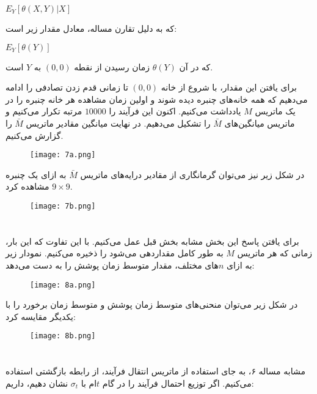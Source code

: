 \documentclass{scribe-cgenomics}
\begin{document}
\begin{center}
$
E_Y[\theta (X, Y) | X]
$
\end{center}

که به دلیل تقارن مساله، معادل مقدار زیر است:

\begin{center}
$
E_Y[\theta (Y)]
$
\end{center}

که در آن
$\theta(Y)$
زمان رسیدن از نقطه
$(0,0)$
به
$Y$
است.

برای یافتن این مقدار، با شروع از خانه
$(0,0)$
تا زمانی قدم زدن تصادفی را ادامه می‌دهیم که همه خانه‌های چنبره دیده شوند و اولین زمان مشاهده هر خانه چنبره را در یک ماتریس
$M$
یادداشت می‌کنیم. اکنون این فرآیند را
$10000$
مرتبه تکرار می‌کنیم و ماتریس میانگین‌های
$\bar{M}$
را تشکیل می‌دهیم. در نهایت میانگین مقادیر ماتریس
$\bar{M}$
را گزارش می‌کنیم.


\begin{figure}[h]\label{7}
\texttt{[image: 7a.png]}
\centering
\end{figure}

در شکل زیر نیز می‌توان گرمانگاری از مقادیر درایه‌های ماتریس
$\bar{M}$
به ازای یک چنبره
$9 \times 9$
مشاهده کرد.

\begin{figure}[h]\label{7hist}
\texttt{[image: 7b.png]}
\centering
\end{figure}

\newpage
\section{}

برای یافتن پاسخ این بخش مشابه بخش قبل عمل می‌کنیم. با این تفاوت که این بار، زمانی که هر ماتریس
$M$
به طور کامل مقداردهی می‌شود را ذخیره می‌کنیم. نمودار زیر به ازای
$n$های
مختلف، مقدار متوسط زمان پوشش را به دست می‌دهد:

\begin{figure}[h]\label{8}
\texttt{[image: 8a.png]}
\centering
\end{figure}

در شکل زیر می‌توان منحنی‌های متوسط زمان پوشش و متوسط زمان برخورد را با یکدیگر مقایسه کرد:


\begin{figure}[h]\label{8_comp}
\texttt{[image: 8b.png]}
\centering
\end{figure}

\newpage
\section{}
مشابه مساله ۶، به جای استفاده از ماتریس انتقال فرآیند، از رابطه بازگشتی استفاده می‌کنیم. اگر توزیع احتمال فرآیند را در گام
$t$ام 
با
$\sigma_t$
نشان دهیم، داریم:
\end{document}
